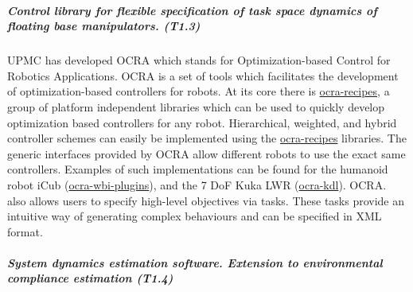 \subparagraph*{Control library for flexible specification of task space
  dynamics of floating base manipulators. (T1.3)}


UPMC has developed OCRA which stands for Optimization-based Control for Robotics Applications. OCRA is a set of tools which facilitates the development of optimization-based controllers for robots. At its core there is \href{https://github.com/ocra-recipes/ocra-recipes}{ocra-recipes}, a group of platform independent libraries which can be used to quickly develop optimization based controllers for any robot. Hierarchical, weighted, and hybrid controller schemes can easily be implemented using the \href{https://github.com/ocra-recipes/ocra-recipes}{ocra-recipes} libraries. The generic interfaces provided by OCRA allow different robots to use the exact same controllers. Examples of such implementations can be found for the humanoid robot iCub (\href{https://github.com/ocra-recipes/ocra-wbi-plugins}{ocra-wbi-plugins}), and the 7 DoF Kuka LWR (\href{https://github.com/kuka-isir/ocra-kdl}{ocra-kdl}). OCRA. also allows users to specify high-level objectives via tasks. These tasks provide an intuitive way of generating complex behaviours and can be specified in XML format.



\subparagraph*{System dynamics estimation software. Extension to
environmental compliance estimation (T1.4)}

